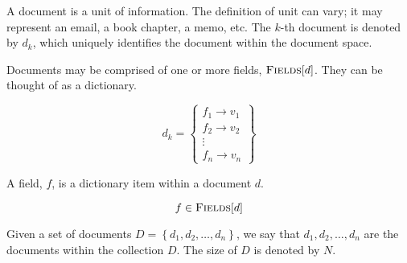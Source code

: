 	\begin{defn}[Document]
	\label{def:document}
		A document is a unit of information.  The definition of unit can vary; it may represent an email, a book chapter, a memo, etc.  The $k$-th document is denoted by $d_k$, which uniquely identifies the document within the document space.
		
		Documents may be comprised of one or more fields, $\textsc{Fields}\lbrack d\rbrack$.  They can be thought of as a dictionary.
		
		$$
			d_k = \left\{
				\begin{array}{c}
					f_1 \rightarrow v_1 \\
					f_2 \rightarrow v_2 \\
					\vdots \\
					f_n \rightarrow v_n
				\end{array}
			\right\}
		$$
		
	\end{defn}
	
	\begin{defn}[Field]
	\label{def:field}
		A field, $f$, is a dictionary item within a document $d$.
		
		$$f \in \textsc{Fields}\lbrack d\rbrack$$
		
		
	\end{defn}
	
	\begin{defn}
	\label{def:document-collection}
		Given a set of documents $D = \left\{d_1, d_2, \dotsc, d_n\right\}$, we say that $d_1, d_2, \dotsc, d_n$ are the documents within the collection $D$.  The size of $D$ is denoted by $N$.
	\end{defn}
	
	\begin{defn}[Term]
	\label{def:term}
	
	\end{defn}
	
